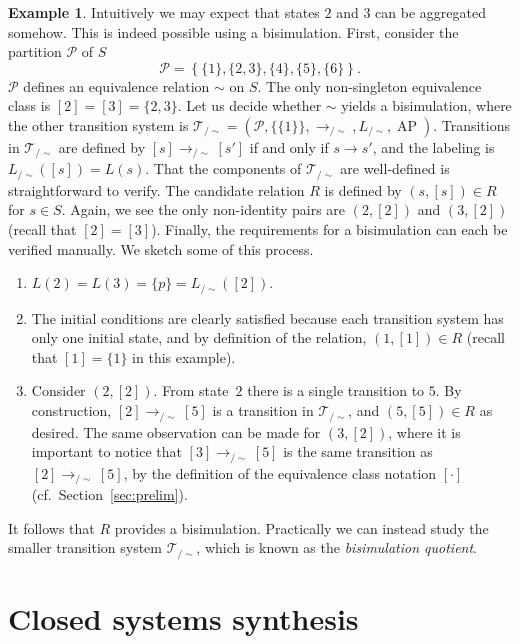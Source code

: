 \documentclass{amsart}
\DeclareMathOperator{\ap}{AP}
\theoremstyle{plain}
\theoremstyle{definition}
\theoremstyle{definition}
\newtheorem{examp}{Example}
\begin{document}
\begin{examp}
Intuitively we may expect that states $2$ and $3$ can be
aggregated somehow.  This is indeed possible using a bisimulation.  First,
consider the partition $\mathcal{P}$ of $S$
\[
\mathcal{P} = \left\{ \{1\}, \{2, 3\}, \{4\}, \{5\}, \{6\} \right\}.
\]
$\mathcal{P}$ defines an equivalence relation $\sim$ on $S$.  The only
non-singleton equivalence class is $[2] = [3] = \{2, 3\}$.  Let us decide
whether $\sim$ yields a bisimulation, where the other transition system is
$\mathcal{T}_{/\sim} = (\mathcal{P}, \{\{1\}\}, \longrightarrow_{/\sim}, L_{/\sim}, \ap)$.
Transitions in $\mathcal{T}_{/\sim}$ are defined by $[s]\longrightarrow_{/\sim} [s']$ if
and only if $s\longrightarrow s'$, and the labeling is $L_{/\sim}([s]) = L(s)$.
That the components of $\mathcal{T}_{/\sim}$ are well-defined is straightforward to verify.
The candidate relation $R$ is defined by $(s,[s])\in R$ for $s\in S$.  Again, we
see the only non-identity pairs are $(2,[2])$ and $(3,[2])$ (recall that
$[2]=[3]$).  Finally, the requirements for a bisimulation can each be verified
manually.  We sketch some of this process.
\begin{enumerate}
\item $L(2)=L(3)=\{p\}=L_{/\sim}([2])$.
\item The initial conditions are clearly satisfied because each transition system has only one initial state, and by definition of the relation, $(1, [1])\in R$ (recall that $[1]=\{1\}$ in this example).
\item Consider $(2,[2])$.  From state~$2$ there is a single transition to $5$. By construction, $[2]\longrightarrow_{/\sim}[5]$ is a transition in $\mathcal{T}_{/\sim}$, and $(5,[5])\in R$ as desired.  The same observation can be made for $(3,[2])$, where it is important to notice that $[3]\longrightarrow_{/\sim}[5]$ is the same transition as $[2]\longrightarrow_{/\sim}[5]$, by the definition of the equivalence class notation $[\cdot]$ (cf.\ Section~\ref{sec:prelim}).
\end{enumerate}
It follows that $R$ provides a bisimulation.  Practically we can instead study
the smaller transition system $\mathcal{T}_{/\sim}$, which is known as the \textit{bisimulation quotient}.
\end{examp}


\section{Closed systems synthesis}\label{sec:clsyssynth}
\end{document}
